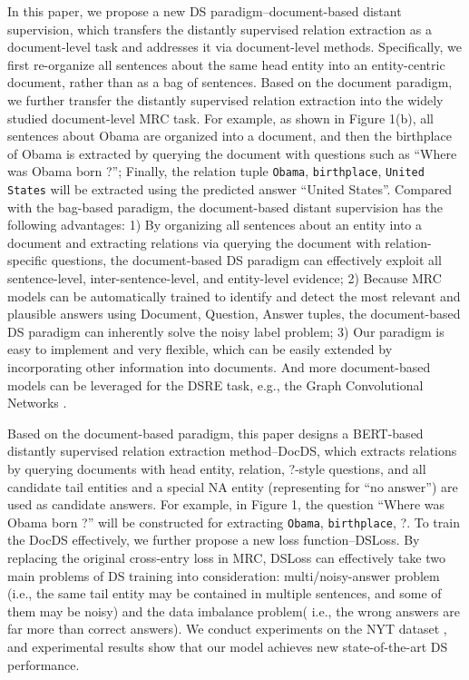 \documentclass[11pt,a4paper]{article}
\begin{document}
  In this paper, we propose a new DS paradigm--document-based distant supervision, which transfers the distantly supervised relation extraction as a document-level task and addresses it via document-level methods.
  Specifically, we first re-organize all sentences about the same head entity into an entity-centric document, rather than as a bag of sentences.
  Based on the document paradigm, we further transfer the distantly supervised relation extraction into the widely studied document-level MRC task.
  For example, as shown in Figure 1(b), all sentences about Obama are organized into a document, and then the birthplace of Obama is extracted by querying the document with questions such as ``Where was Obama born ?'';
  Finally, the relation tuple \texttt{Obama}, \texttt{birthplace}, \texttt{United States} will be extracted using the predicted answer ``United States''.
  Compared with the bag-based paradigm, the document-based distant supervision has the following advantages:
  1) By organizing all sentences about an entity into a document and extracting relations via querying the document with relation-specific questions, the document-based DS paradigm can effectively exploit all sentence-level, inter-sentence-level, and entity-level evidence;
  2) Because MRC models can be automatically trained to identify and detect the most relevant and plausible answers using Document, Question, Answer tuples, the document-based DS paradigm can inherently solve the noisy label problem;
  3) Our paradigm is easy to implement and very flexible, which can be easily extended by incorporating other information into documents. And more document-based models can be leveraged for the DSRE task, e.g., the Graph Convolutional Networks \cite{kipf_semi-supervised_2017}.
  
  Based on the document-based paradigm, this paper designs a BERT-based \cite{devlin_bert_2019} distantly supervised relation extraction method--DocDS, which extracts relations by querying documents with head entity, relation, ?-style questions, and all candidate tail entities and a special NA entity (representing for ``no answer'') are used as candidate answers.
  For example, in Figure 1, the question ``Where was Obama born ?'' will be constructed for extracting \texttt{Obama}, \texttt{birthplace}, ?.
  To train the DocDS effectively, we further propose a new loss function--DSLoss.
  By replacing the original cross-entry loss in MRC, DSLoss can effectively take two main problems of DS training into consideration: multi/noisy-answer problem (i.e., the same tail entity may be contained in multiple sentences, and some of them may be noisy) and the data imbalance problem( i.e., the wrong answers are far more than correct answers).
  We conduct experiments on the NYT dataset \cite{riedel_modeling_2010}, and experimental results show that our model achieves new state-of-the-art DS performance.
  
\end{document}
